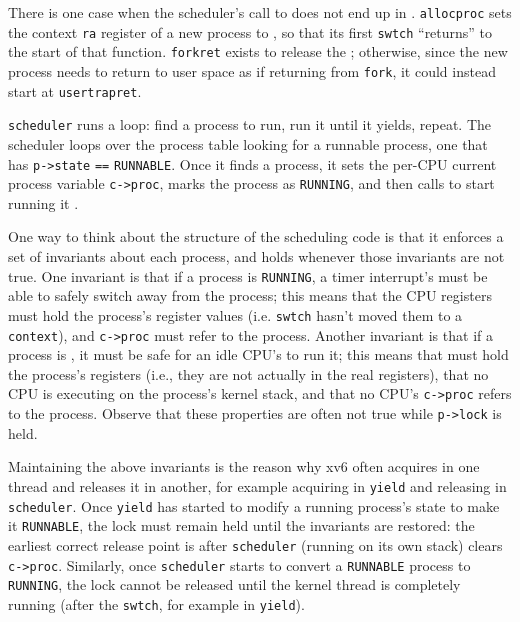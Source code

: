 There is one case when the scheduler's call to
does not end up in
.
\lstinline{allocproc} sets the context \lstinline{ra}
register of a new process to
,
so that its first \lstinline{swtch} ``returns'' 
to the start of that function.
\lstinline{forkret}
exists to release the 
;
otherwise, since the new process needs to
return to user space as if returning from \lstinline{fork},
it could instead start at
\lstinline{usertrapret}.

\lstinline{scheduler}
runs a loop:
find a process to run, run it until it yields, repeat.
The scheduler
loops over the process table
looking for a runnable process, one that has
\lstinline{p->state} 
\lstinline{==}
\lstinline{RUNNABLE}.
Once it finds a process, it sets the per-CPU current process
variable
\lstinline{c->proc},
marks the process as
\lstinline{RUNNING},
and then calls
to start running it
.

One way to think about the structure of the scheduling code is
that it enforces a set of invariants about each process,
and holds
whenever those invariants are not true.
One invariant is that if a process is
\lstinline{RUNNING},
a timer interrupt's
must be able to safely switch away from the process;
this means that the CPU registers must hold the process's register values
(i.e. 
\lstinline{swtch}
hasn't moved them to a
\lstinline{context}),
and
\lstinline{c->proc}
must refer to the process.
Another invariant is that if a process is
,
it must be safe for
an idle CPU's
to run it;
this means that 
must hold the process's registers (i.e., they are
not actually in the real registers),
that no CPU is executing on the process's kernel stack,
and that no CPU's
\lstinline{c->proc}
refers to the process.
Observe that these properties are often not true while
\lstinline{p->lock} is held.

Maintaining the above invariants is the reason why xv6 often acquires 
in one thread and releases it in another,
for example acquiring in
\lstinline{yield}
and releasing in
\lstinline{scheduler}.
Once \lstinline{yield} has started to modify a running process's state
to make it
\lstinline{RUNNABLE},
the lock must remain held until the invariants are restored:
the earliest correct release point is after
\lstinline{scheduler}
(running on its own stack)
clears
\lstinline{c->proc}.
Similarly, once 
\lstinline{scheduler}
starts to convert a \lstinline{RUNNABLE} process to
\lstinline{RUNNING},
the lock cannot be released until the kernel thread
is completely running (after the
\lstinline{swtch},
for example in
\lstinline{yield}).

